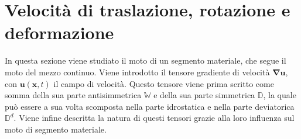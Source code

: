\documentclass[letterpaper,10pt,italian]{jupyterBook}
\begin{document}
\section{Velocità di traslazione, rotazione e deformazione}
\label{\detokenize{polimi/fluidmechanics-ita/template/capitoli/03_cinematica/12teoria:velocita-di-traslazione-rotazione-e-deformazione}}
\sphinxAtStartPar
In questa sezione viene studiato il moto di un segmento materiale, che
segue il moto del mezzo continuo. Viene introdotto il tensore gradiente
di velocità \(\mathbf{\nabla}\mathbf{u}\), con \(\mathbf{u}(\mathbf{x},t)\) il campo di
velocità. Questo tensore viene prima scritto come somma della sua parte
antisimmetrica \(\mathbb{W}\) e della sua parte simmetrica \(\mathbb{D}\),
la quale può essere a sua volta scomposta nella parte idrostatica e
nella parte deviatorica \(\mathbb{D}^d\). Viene infine descritta la natura
di questi tensori grazie alla loro influenza sul moto di segmento
materiale.
\end{document}
